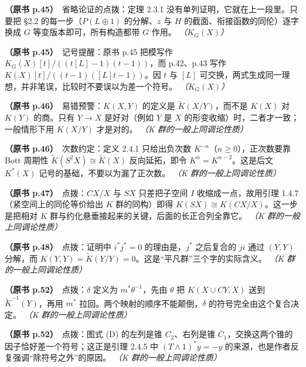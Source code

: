 \noindent \textbf{（原书 p.45）}\ 省略论证的点拨：定理 2.3.1 没有单列证明，它就在上一段里。只要把 §2.2 的每一步（$P(L\oplus1)$ 的分解、$z$ 与 $H$ 的截面、衔接函数的同伦）逐字换成 $G$ 等变版本即可，所有构造都带 $G$ 作用。 \textit{（$K_G(X)$）}\par\smallskip

\noindent \textbf{（原书 p.45）}\ 记号提醒：原书 p.45 把模写作 $K_G(X)[t]/((t[L]-1)(t-1))$，而 p.42、p.43 写作 $K(X)[t]/((t-1)([L]t-1))$。因 $t$ 与 $[L]$ 可交换，两式生成同一理想，并非笔误，比较时不要误以为差一个符号。 \textit{（$K_G(X)$）}\par\smallskip

\noindent \textbf{（原书 p.46）}\ 易错预警：$K(X,Y)$ 的定义是 $\tilde K(X/Y)$，而不是 $K(X)$ 对 $K(Y)$ 的商。只有 $Y\to X$ 是好对（例如 $Y$ 是 $X$ 的形变收缩）时，二者才一致；一般情形下用 $K(X/Y)$ 才是对的。 \textit{（K 群的一般上同调论性质）}\par\smallskip

\noindent \textbf{（原书 p.46）}\ 次数约定：定义 2.4.1 只给出负次数 $K^{-n}$（$n\ge0$），正次数要靠 Bott 周期性 $\tilde K(S^2X)\cong\tilde K(X)$ 反向延拓，即令 $K^{n}=K^{n-2}$。这是后文 $K^*(X)$ 记号的基础，不要以为漏了正次数。 \textit{（K 群的一般上同调论性质）}\par\smallskip

\noindent \textbf{（原书 p.47）}\ 点拨：$CX/X$ 与 $SX$ 只差把子空间 $I$ 收缩成一点，故用引理 1.4.7（紧空间上的同伦等价给出 $K$ 群的同构）即得 $K(SX)\cong K(CX/X)$。这一步是把相对 $K$ 群与约化悬垂接起来的关键，后面的长正合列全靠它。 \textit{（K 群的一般上同调论性质）}\par\smallskip

\noindent \textbf{（原书 p.48）}\ 点拨：证明中 $i^*j^*=0$ 的理由是，$j^*$ 之后复合的 $ji$ 通过 $(Y,Y)$ 分解，而 $K(Y,Y)=\tilde K(Y/Y)=0$。这是“平凡群”三个字的实际含义。 \textit{（K 群的一般上同调论性质）}\par\smallskip

\noindent \textbf{（原书 p.52）}\ 点拨：$\delta$ 定义为 $m^*\theta^{-1}$，先由 $\theta$ 把 $K(X\cup CY,X)$ 送到 $\tilde K^{-1}(Y)$，再用 $m^*$ 拉回。两个映射的顺序不能颠倒，$\delta$ 的符号完全由这个复合决定。 \textit{（K 群的一般上同调论性质）}\par\smallskip

\noindent \textbf{（原书 p.52）}\ 点拨：图式 (D) 的左列是锥 $C_2$、右列是锥 $C_1$，交换这两个锥的因子恰好差一个符号；这正是引理 2.4.5 中 $(T\wedge1)^*y=-y$ 的来源，也是作者反复强调“除符号之外”的原因。 \textit{（K 群的一般上同调论性质）}\par\smallskip

